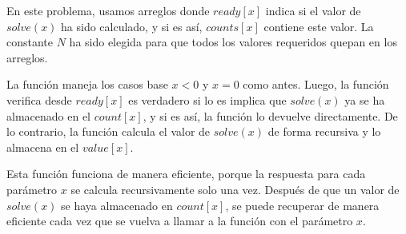 En este problema, usamos arreglos donde $ready[x]$ indica si el valor de $solve(x)$ ha sido calculado, y si es así, $counts[x]$ contiene este valor. La constante $N$ ha sido elegida para que todos los valores requeridos quepan en los arreglos.

La función maneja los casos base $x < 0$ y $x = 0$ como antes. Luego, la función verifica desde  $ready[x]$ es verdadero si lo es implica que $solve(x)$ ya se ha almacenado en el $count[x]$, y si es así, la función lo devuelve directamente. De lo contrario, la función calcula el valor de $solve(x)$ de forma recursiva y lo almacena en el $value[x]$.

Esta función funciona de manera eficiente, porque la respuesta para cada parámetro $x$ se calcula recursivamente solo una vez. Después de que un valor de $solve(x)$ se haya almacenado en $count[x]$, se puede recuperar de manera eficiente cada vez que se vuelva a llamar a la función con el parámetro $x$. 




 